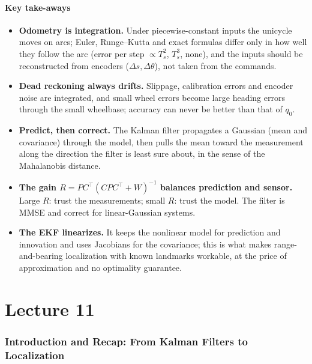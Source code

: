 \documentclass[11pt,a4paper]{article}
\def\boldsymbol#1{#1}%
\def\mathbf#1{#1}%
\newcommand{\tp}{^{\top}}
\newcommand{\Ts}{T_s}
\newcommand{\bq}{\boldsymbol{q}}
\newcommand{\mC}{\mathbf{C}}
\newcommand{\mP}{\mathbf{P}}
\newcommand{\mR}{\mathbf{R}}
\newcommand{\mW}{\mathbf{W}}
\newcommand{\slides}[1]{\texorpdfstring{\hspace{0.5em}{\normalfont\small\emph{(#1)}}}{}}
\theoremstyle{definition}
\theoremstyle{plain}
\theoremstyle{remark}
\begin{document}
\subsection{Key take-aways}

\begin{itemize}
\item \textbf{Odometry is integration.} Under piecewise-constant inputs the unicycle moves on arcs; Euler, Runge--Kutta and exact formulas differ only in how well they
follow the arc (error per step $\propto\Ts^2$, $\Ts^3$, none), and the inputs should be reconstructed from encoders ($\Delta s,\Delta\theta$), not taken from the commands.
\item \textbf{Dead reckoning always drifts.} Slippage, calibration errors and encoder noise are integrated, and small wheel errors become large heading errors
through the small wheelbase; accuracy can never be better than that of $\bq_0$.
\item \textbf{Predict, then correct.} The Kalman filter propagates a Gaussian (mean and covariance) through the model, then pulls the mean toward the measurement
along the direction the filter is least sure about, in the sense of the Mahalanobis distance.
\item \textbf{The gain $\mR=\mP\mC\tp(\mC\mP\mC\tp+\mW)^{-1}$ balances prediction and sensor.} Large $\mR$: trust the measurements; small $\mR$: trust the model. The
filter is MMSE and correct for linear-Gaussian systems.
\item \textbf{The EKF linearizes.} It keeps the nonlinear model for prediction and innovation and uses Jacobians for the covariance; this is what makes range-and-bearing
localization with known landmarks workable, at the price of approximation and no optimality guarantee.
\end{itemize}

\newpage

\setcounter{section}{0}
\renewcommand{\thesection}{\arabic{section}}
\part{Lecture 11}

\section{Introduction and Recap: From Kalman Filters to Localization}
\slides{slides 1}
\end{document}
